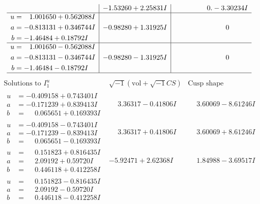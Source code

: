 \documentclass[1p]{elsarticle_modified}
\theoremstyle{definition}
\newcommand{\I}{\sqrt{-1}}
\begin{document}
$$\begin{array}{c|c|c}
 & -1.53260 + 2.25831 I & \phantom{-0.000000 } 0. - 3.30234 I \\ \hline\begin{aligned}
u &= \phantom{-}1.001650 + 0.562088 I \\
a &= -0.813131 + 0.346744 I \\
b &= -1.46484 + 0.18792 I\end{aligned}
 & -0.98280 + 1.31925 I & \phantom{-0.000000 } 0 \\ \hline\begin{aligned}
u &= \phantom{-}1.001650 - 0.562088 I \\
a &= -0.813131 - 0.346744 I \\
b &= -1.46484 - 0.18792 I\end{aligned}
 & -0.98280 - 1.31925 I & \phantom{-0.000000 } 0\\
 \hline 
 \end{array}$$\newpage$$\begin{array}{c|c|c}  
\text{Solutions to }I^u_{1}& \I (\text{vol} + \sqrt{-1}CS) & \text{Cusp shape}\\
 \hline 
\begin{aligned}
u &= -0.409158 + 0.743401 I \\
a &= -0.171239 + 0.839413 I \\
b &= \phantom{-}0.065651 + 0.169393 I\end{aligned}
 & \phantom{-}3.36317 - 0.41806 I & \phantom{-}3.60069 - 8.61246 I \\ \hline\begin{aligned}
u &= -0.409158 - 0.743401 I \\
a &= -0.171239 - 0.839413 I \\
b &= \phantom{-}0.065651 - 0.169393 I\end{aligned}
 & \phantom{-}3.36317 + 0.41806 I & \phantom{-}3.60069 + 8.61246 I \\ \hline\begin{aligned}
u &= \phantom{-}0.151823 + 0.816435 I \\
a &= \phantom{-}2.09192 + 0.59720 I \\
b &= \phantom{-}0.446118 + 0.412258 I\end{aligned}
 & -5.92471 + 2.62368 I & \phantom{-}1.84988 - 3.69517 I \\ \hline\begin{aligned}
u &= \phantom{-}0.151823 - 0.816435 I \\
a &= \phantom{-}2.09192 - 0.59720 I \\
b &= \phantom{-}0.446118 - 0.412258 I\end{aligned}

\end{array}$$
\end{document}

